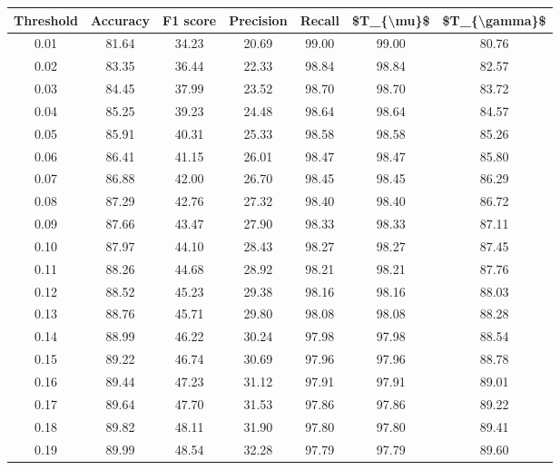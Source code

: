 \begin{tabular}{|c|c|c|c|c|c|c|}
\hline
 Threshold &  Accuracy &  F1 score &  Precision &  Recall &  \$T\_\{\textbackslash mu\}\$ &  \$T\_\{\textbackslash gamma\}\$ \\
\hline
      0.01 &     81.64 &     34.23 &      20.69 &   99.00 &      99.00 &         80.76 \\
      0.02 &     83.35 &     36.44 &      22.33 &   98.84 &      98.84 &         82.57 \\
      0.03 &     84.45 &     37.99 &      23.52 &   98.70 &      98.70 &         83.72 \\
      0.04 &     85.25 &     39.23 &      24.48 &   98.64 &      98.64 &         84.57 \\
      0.05 &     85.91 &     40.31 &      25.33 &   98.58 &      98.58 &         85.26 \\
      0.06 &     86.41 &     41.15 &      26.01 &   98.47 &      98.47 &         85.80 \\
      0.07 &     86.88 &     42.00 &      26.70 &   98.45 &      98.45 &         86.29 \\
      0.08 &     87.29 &     42.76 &      27.32 &   98.40 &      98.40 &         86.72 \\
      0.09 &     87.66 &     43.47 &      27.90 &   98.33 &      98.33 &         87.11 \\
      0.10 &     87.97 &     44.10 &      28.43 &   98.27 &      98.27 &         87.45 \\
      0.11 &     88.26 &     44.68 &      28.92 &   98.21 &      98.21 &         87.76 \\
      0.12 &     88.52 &     45.23 &      29.38 &   98.16 &      98.16 &         88.03 \\
      0.13 &     88.76 &     45.71 &      29.80 &   98.08 &      98.08 &         88.28 \\
      0.14 &     88.99 &     46.22 &      30.24 &   97.98 &      97.98 &         88.54 \\
      0.15 &     89.22 &     46.74 &      30.69 &   97.96 &      97.96 &         88.78 \\
      0.16 &     89.44 &     47.23 &      31.12 &   97.91 &      97.91 &         89.01 \\
      0.17 &     89.64 &     47.70 &      31.53 &   97.86 &      97.86 &         89.22 \\
      0.18 &     89.82 &     48.11 &      31.90 &   97.80 &      97.80 &         89.41 \\
      0.19 &     89.99 &     48.54 &      32.28 &   97.79 &      97.79 &         89.60 \\

\end{tabular}
